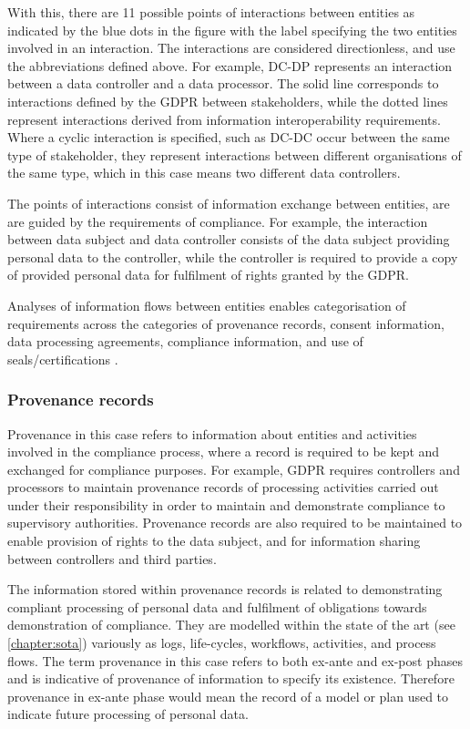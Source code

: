 With this, there are 11 possible points of interactions between entities as indicated by the blue dots in the figure with the label specifying the two entities involved in an interaction.
The interactions are considered directionless, and use the abbreviations defined above. For example, DC-DP represents an interaction between a data controller and a data processor.
The solid line corresponds to interactions defined by the GDPR between stakeholders, while the dotted lines represent interactions derived from information interoperability requirements.
Where a cyclic interaction is specified, such as DC-DC occur between the same type of stakeholder, they represent interactions between different organisations of the same type, which in this case means two different data controllers.

The points of interactions consist of information exchange between entities, are are guided by the requirements of compliance. For example, the interaction between data subject and data controller consists of the data subject providing personal data to the controller, while the controller is required to provide a copy of provided personal data for fulfilment of rights granted by the GDPR.

Analyses of information flows between entities enables categorisation of requirements across the categories of provenance records, consent information, data processing agreements, compliance information, and use of seals/certifications \cite{pandit_exploration_2018}.

\subsubsection{Provenance records}
Provenance in this case refers to information about entities and activities involved in the compliance process, where a record is required to be kept and exchanged for compliance purposes. For example, GDPR requires controllers and processors to maintain provenance records of processing activities carried out under their responsibility in order to maintain and demonstrate compliance to supervisory authorities. Provenance records are also required to be maintained to enable provision of rights to the data subject, and for information sharing between controllers and third parties.

The information stored within provenance records is related to demonstrating compliant processing of personal data and fulfilment of obligations towards demonstration of compliance. They are modelled within the state of the art (see \autoref{chapter:sota}) variously as logs, life-cycles, workflows, activities, and process flows. The term provenance in this case refers to both ex-ante and ex-post phases and is indicative of provenance of information to specify its existence. Therefore provenance in ex-ante phase would mean the record of a model or plan used to indicate future processing of personal data.

